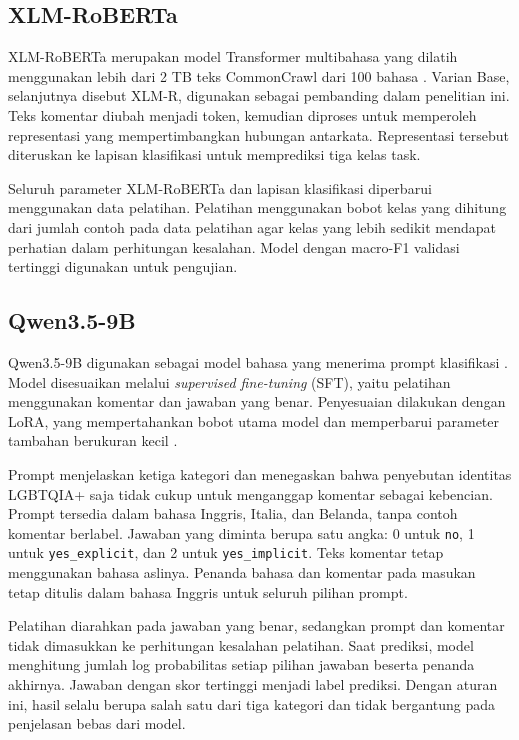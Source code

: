 \documentclass[11pt]{article}
\begin{document}
\subsection{XLM-RoBERTa}
XLM-RoBERTa merupakan model Transformer multibahasa yang dilatih menggunakan lebih dari 2 TB teks CommonCrawl dari 100 bahasa \citep{conneau-etal-2020-unsupervised}. Varian Base, selanjutnya disebut XLM-R, digunakan sebagai pembanding dalam penelitian ini. Teks komentar diubah menjadi token, kemudian diproses untuk memperoleh representasi yang mempertimbangkan hubungan antarkata. Representasi tersebut diteruskan ke lapisan klasifikasi untuk memprediksi tiga kelas task.

Seluruh parameter XLM-RoBERTa dan lapisan klasifikasi diperbarui menggunakan data pelatihan. Pelatihan menggunakan bobot kelas yang dihitung dari jumlah contoh pada data pelatihan agar kelas yang lebih sedikit mendapat perhatian dalam perhitungan kesalahan. Model dengan macro-F1 validasi tertinggi digunakan untuk pengujian.

\subsection{Qwen3.5-9B}
Qwen3.5-9B digunakan sebagai model bahasa yang menerima prompt klasifikasi \citep{qwen-team-2026-qwen35}. Model disesuaikan melalui \textit{supervised fine-tuning} (SFT), yaitu pelatihan menggunakan komentar dan jawaban yang benar. Penyesuaian dilakukan dengan LoRA, yang mempertahankan bobot utama model dan memperbarui parameter tambahan berukuran kecil \citep{hu-etal-2021-lora}.

Prompt menjelaskan ketiga kategori dan menegaskan bahwa penyebutan identitas LGBTQIA+ saja tidak cukup untuk menganggap komentar sebagai kebencian. Prompt tersedia dalam bahasa Inggris, Italia, dan Belanda, tanpa contoh komentar berlabel. Jawaban yang diminta berupa satu angka: 0 untuk \texttt{no}, 1 untuk \texttt{yes\_explicit}, dan 2 untuk \texttt{yes\_implicit}. Teks komentar tetap menggunakan bahasa aslinya. Penanda bahasa dan komentar pada masukan tetap ditulis dalam bahasa Inggris untuk seluruh pilihan prompt.

Pelatihan diarahkan pada jawaban yang benar, sedangkan prompt dan komentar tidak dimasukkan ke perhitungan kesalahan pelatihan. Saat prediksi, model menghitung jumlah log probabilitas setiap pilihan jawaban beserta penanda akhirnya. Jawaban dengan skor tertinggi menjadi label prediksi. Dengan aturan ini, hasil selalu berupa salah satu dari tiga kategori dan tidak bergantung pada penjelasan bebas dari model.
\end{document}
